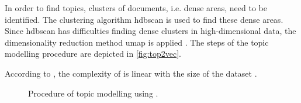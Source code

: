 In order to find topics, clusters of documents, i.e. dense areas, need to be identified.
The clustering algorithm \ac{hdbscan} is used to find these dense areas.
Since \ac{hdbscan} has difficulties finding dense clusters in high-dimensional data, 
the dimensionality reduction method \ac{umap} is applied \cite{Top2Vec2020}.
The steps of the topic modelling procedure \topTwovec{} are depicted in \autoref{fig:top2vec}.

According to \citeauthor{Topic2Vec2015}, the complexity of \topTwovec{} is linear with the size of the dataset \cite{Topic2Vec2015}.

\begin{figure}[htp] %
    \centering
    
    \caption{Procedure of topic modelling using \topTwovec{}.}
    \label{fig:top2vec}
\end{figure}